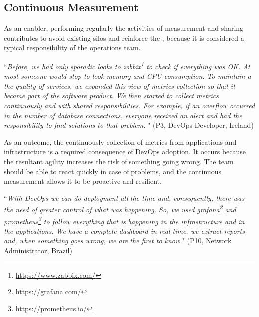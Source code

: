 
\subsection{Continuous Measurement}

As an enabler, performing regularly the
activities of measurement and sharing
contributes to avoid existing silos and reinforce the \cc, because it is
considered a typical responsibility of the operations team.

\begin{mq}
``\emph{Before, we had only sporadic looks to
zabbix\footnote{\url{https://www.zabbix.com/}} to check if everything was OK.
At most someone would stop to look memory and CPU consumption. To maintain a
the quality of services, we expanded this view of metrics collection so that it
became part of the software product. We then started to collect metrics continuously
and with shared responsibilities. For example, if an overflow occurred in the
number of database connections, everyone received an alert and had
the responsibility to find solutions to that problem. %
}" (P3, DevOps Developer, Ireland)
\end{mq}

As an outcome, the continuously collection of metrics from applications and
infrastructure is a required consequence of DevOps adoption. It occurs because
the resultant agility increases the risk of something going wrong. The team
should be able to react quickly in case of problems, and the continuous
measurement allows it to be proactive and resilient.

\begin{mq}
``\emph{With DevOps we can do deployment all the time and, consequently, there was
the need of greater control of what was happening. So, we used
grafana\footnote{\url{https://grafana.com/}} and
prometheus\footnote{\url{https://prometheus.io/}} to follow everything that is
happening in the infrastructure and in the applications. We have a complete
dashboard in real time, we extract reports and, when something goes wrong, we
are the first to know.}" (P10, Network Administrator, Brazil)
\end{mq}

